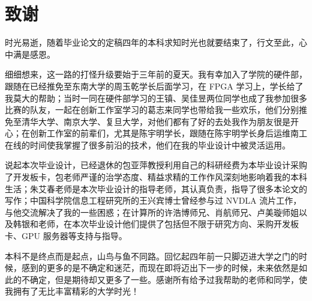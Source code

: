 \chapter[致谢]{致\quad 谢}%
\thispagestyle{noheaderstyle}%

时光易逝，随着毕业论文的定稿四年的本科求知时光也就要结束了，行文至此，心中满是感恩。

细细想来，这一路的打怪升级要始于三年前的夏天。我有幸加入了学院的硬件部，跟随在已经推免至东南大学的周玉乾学长后面学习，在 FPGA 学习上，学长给了我莫大的帮助；当时一同在硬件部学习的王镇、吴佳昱两位同学也成了我参加很多比赛的队友，一起在创新工作室学习的葛志来同学也带给我一些欢乐，他们分别推免至清华大学、南京大学、复旦大学，对他们都有了好的去处我作为朋友很是开心；在创新工作室的前辈们，尤其是陈宇明学长，跟随在陈宇明学长身后运维南工在线的时间使我掌握了很多前沿的技术，他们在我的毕业设计中被灵活运用。

说起本次毕业设计，已经退休的包亚萍教授利用自己的科研经费为本毕业设计采购了开发板卡，包老师严谨的治学态度、精益求精的工作作风深刻地影响着我的本科生活；朱艾春老师是本次毕业设计的指导老师，其认真负责，指导了很多本论文的写作；中国科学院信息工程研究所的王兴宾博士曾经参与过 NVDLA 流片工作，与他交流解决了我的一些困惑；在计算所的许浩博师兄、肖航师兄、卢美璇师姐以及韩银和老师，在本次毕业设计他们提供了包括但不限于研究方向、采购开发板卡、GPU 服务器等支持与指导。

本科不是终点而是起点，山鸟与鱼不同路。回忆起四年前一只脚迈进大学之门的时候，感到的更多的是不确定和迷茫，而现在即将迈出下一步的时候，未来依然是如此的不确定，但是期待却又更多了一些。感谢所有给予过我帮助的老师和同学，使我拥有了无比丰富精彩的大学时光！

\cleardoublepage[plain]%
